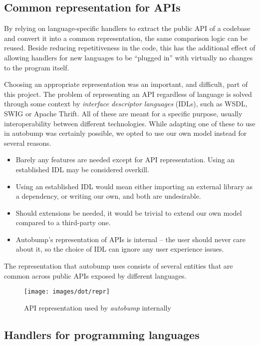\documentclass{l4proj}
\begin{document}
\subsection{Common representation for APIs}

By relying on language-specific handlers to extract the public API of
a codebase and convert it into a common representation, the same
comparison logic can be reused. Beside reducing repetitiveness in the
code, this has the additional effect of allowing handlers for new
languages to be ``plugged in'' with virtually no changes to the
program itself.

Choosing an appropriate representation was an important, and
difficult, part of this project. The problem of representing an API
regardless of language is solved through some context by
\textit{interface descriptor languages} (IDLs), such as
WSDL\cite{WSDL}, SWIG\cite{SWIG} or Apache Thrift\cite{Thrift}. All of
these are meant for a specific purpose, usually interoperability between
different technologies. While adapting one of these to use in autobump
was certainly possible, we opted to use our own model instead for
several reasons.

\begin{itemize}
\item Barely any features are needed except for API representation.
Using an established IDL may be considered overkill.
\item Using an established IDL would mean either importing an external
library as a dependency, or writing our own, and both are undesirable.
\item Should extensions be needed, it would be trivial to extend our
own model compared to a third-party one.
\item Autobump's representation of APIs is internal -- the user should
never care about it, so the choice of IDL can ignore any user
experience issues.
\end{itemize}

The representation that autobump uses consists of several entities
that are common across public APIs exposed by different languages.

\begin{figure}[H]
\centering
\texttt{[image: images/dot/repr]}
\caption{API representation used by \textit{autobump} internally}
\end{figure}

\label{LanguageHandlers}
\subsection{Handlers for programming languages}
\end{document}
